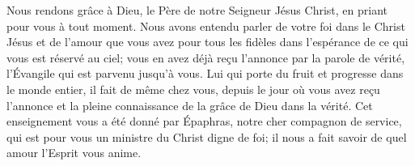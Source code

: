Nous rendons grâce à Dieu, le Père de notre Seigneur Jésus Christ,
	en priant pour vous à tout moment.
Nous avons entendu parler de votre foi dans le Christ Jésus
	et de l’amour que vous avez pour tous les fidèles
	dans l’espérance de ce qui vous est réservé au ciel;
	vous en avez déjà reçu l’annonce par la parole de vérité,
	l’Évangile qui est parvenu jusqu’à vous.
Lui qui porte du fruit et progresse dans le monde entier,
	il fait de même chez vous, depuis le jour où vous avez reçu l’annonce
		et la pleine connaissance de la grâce de Dieu dans la vérité.
Cet enseignement vous a été donné par Épaphras, notre cher compagnon de service,
	qui est pour vous un ministre du Christ digne de foi;
	il nous a fait savoir de quel amour l’Esprit vous anime.
